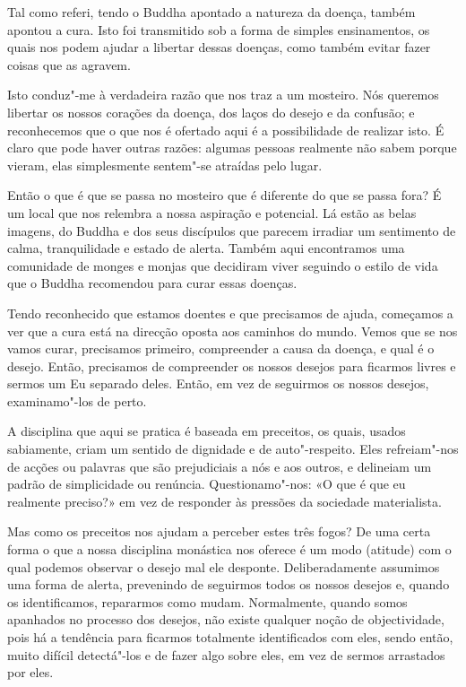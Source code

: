 Tal como referi, tendo o Buddha apontado a natureza da doença, também
apontou a cura. Isto foi transmitido sob a forma de simples
ensinamentos, os quais nos podem ajudar a libertar dessas doenças, como
também evitar fazer coisas que as agravem.

Isto conduz"-me à verdadeira razão que nos traz a um mosteiro. Nós
queremos libertar os nossos corações da doença, dos laços do desejo e da
confusão; e reconhecemos que o que nos é ofertado aqui é a possibilidade
de realizar isto. É claro que pode haver outras razões: algumas pessoas
realmente não sabem porque vieram, elas simplesmente sentem"-se atraídas
pelo lugar.

Então o que é que se passa no mosteiro que é diferente do que se passa
fora? É um local que nos relembra a nossa aspiração e potencial. Lá
estão as belas imagens, do Buddha e dos seus discípulos que parecem
irradiar um sentimento de calma, tranquilidade e estado de alerta.
Também aqui encontramos uma comunidade de monges e monjas que decidiram
viver seguindo o estilo de vida que o Buddha recomendou para curar essas
doenças.

Tendo reconhecido que estamos doentes e que precisamos de ajuda,
começamos a ver que a cura está na direcção oposta aos caminhos do
mundo. Vemos que se nos vamos curar, precisamos primeiro, compreender a
causa da doença, e qual é o desejo. Então, precisamos de compreender os
nossos desejos para ficarmos livres e sermos um Eu separado deles.
Então, em vez de seguirmos os nossos desejos, examinamo"-los de perto.

A disciplina que aqui se pratica é baseada em preceitos, os quais,
usados sabiamente, criam um sentido de dignidade e de auto"-respeito.
Eles refreiam"-nos de acções ou palavras que são prejudiciais a nós e aos
outros, e delineiam um padrão de simplicidade ou renúncia.
Questionamo"-nos: «O que é que eu realmente preciso?» em vez de responder
às pressões da sociedade materialista.

Mas como os preceitos nos ajudam a perceber estes três fogos? De uma
certa forma o que a nossa disciplina monástica nos oferece é um modo
(atitude) com o qual podemos observar o desejo mal ele desponte.
Deliberadamente assumimos uma forma de alerta, prevenindo de seguirmos
todos os nossos desejos e, quando os identificamos, repararmos como
mudam. Normalmente, quando somos apanhados no processo dos desejos, não
existe qualquer noção de objectividade, pois há a tendência para
ficarmos totalmente identificados com eles, sendo então, muito difícil
detectá"-los e de fazer algo sobre eles, em vez de sermos arrastados por
eles.

